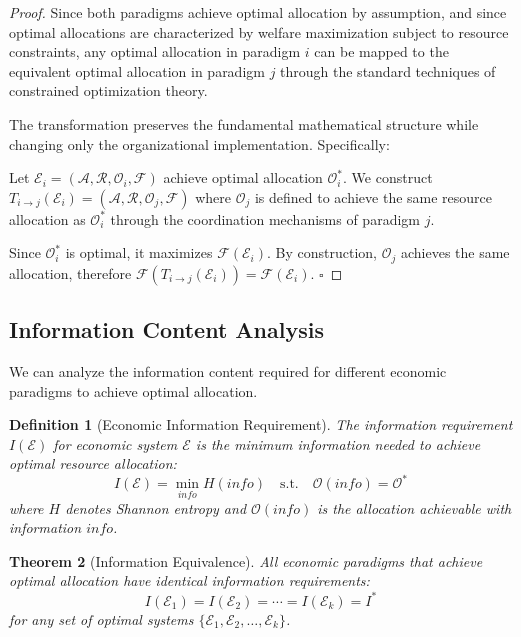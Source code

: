 \documentclass[12pt,a4paper]{article}
\newtheorem{theorem}{Theorem}
\newtheorem{definition}[theorem]{Definition}
\begin{document}
\begin{proof}
Since both paradigms achieve optimal allocation by assumption, and since optimal allocations are characterized by welfare maximization subject to resource constraints, any optimal allocation in paradigm $i$ can be mapped to the equivalent optimal allocation in paradigm $j$ through the standard techniques of constrained optimization theory.

The transformation preserves the fundamental mathematical structure while changing only the organizational implementation. Specifically:

Let $\mathcal{E}_i = (\mathcal{A}, \mathcal{R}, \mathcal{O}_i, \mathcal{F})$ achieve optimal allocation $\mathcal{O}^*_i$. We construct $T_{i \to j}(\mathcal{E}_i) = (\mathcal{A}, \mathcal{R}, \mathcal{O}_j, \mathcal{F})$ where $\mathcal{O}_j$ is defined to achieve the same resource allocation as $\mathcal{O}^*_i$ through the coordination mechanisms of paradigm $j$.

Since $\mathcal{O}^*_i$ is optimal, it maximizes $\mathcal{F}(\mathcal{E}_i)$. By construction, $\mathcal{O}_j$ achieves the same allocation, therefore $\mathcal{F}(T_{i \to j}(\mathcal{E}_i)) = \mathcal{F}(\mathcal{E}_i)$. $\square$
\end{proof}

\subsection{Information Content Analysis}

We can analyze the information content required for different economic paradigms to achieve optimal allocation.

\begin{definition}[Economic Information Requirement]
The information requirement $I(\mathcal{E})$ for economic system $\mathcal{E}$ is the minimum information needed to achieve optimal resource allocation:
\begin{equation}
I(\mathcal{E}) = \min_{info} H(info) \quad \text{s.t.} \quad \mathcal{O}(info) = \mathcal{O}^*
\end{equation}
where $H$ denotes Shannon entropy and $\mathcal{O}(info)$ is the allocation achievable with information $info$.
\end{definition}

\begin{theorem}[Information Equivalence]
All economic paradigms that achieve optimal allocation have identical information requirements:
\begin{equation}
I(\mathcal{E}_1) = I(\mathcal{E}_2) = \cdots = I(\mathcal{E}_k) = I^*
\end{equation}
for any set of optimal systems $\{\mathcal{E}_1, \mathcal{E}_2, \ldots, \mathcal{E}_k\}$.
\end{theorem}
\end{document}
